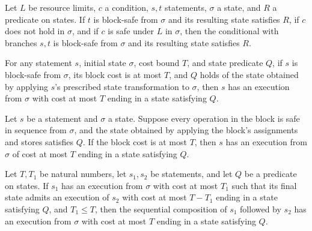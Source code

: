 \begin{theorem}
\label{Light.Stmt.Runs.ite_neg}
\leanok
{}
Let $L$ be resource limits, $c$ a condition, $s,t$ statements, $\sigma$ a state, and $R$
a predicate on states. If $t$ is block-safe from $\sigma$ and its resulting state
satisfies $R$, if $c$ does not hold in $\sigma$, and if $c$ is safe under $L$ in
$\sigma$, then the conditional with branches $s,t$ is block-safe from $\sigma$ and its
resulting state satisfies $R$.
\end{theorem}

\begin{theorem}
\label{Light.Ends.of_blockSafe}
\leanok
{}
For any statement $s$, initial state $\sigma$, cost bound $T$, and state predicate $Q$,
if $s$ is block-safe from $\sigma$, its block cost is at most $T$, and $Q$ holds of the
state obtained by applying $s$'s prescribed state transformation to $\sigma$, then $s$
has an execution from $\sigma$ with cost at most $T$ ending in a state satisfying $Q$.
\end{theorem}

\begin{theorem}
\label{Light.Ends.block}
\leanok
{}
Let $s$ be a statement and $\sigma$ a state. Suppose every operation in the block is
safe in sequence from $\sigma$, and the state obtained by applying the block's
assignments and stores satisfies $Q$. If the block cost is at most $T$, then $s$ has an
execution from $\sigma$ of cost at most $T$ ending in a state satisfying $Q$.
\end{theorem}

\begin{theorem}
\label{Light.Ends.next}
\leanok
{}
Let $T,T_1$ be natural numbers, let $s_1,s_2$ be statements, and let $Q$ be a predicate
on states. If $s_1$ has an execution from $\sigma$ with cost at most $T_1$ such that its
final state admits an execution of $s_2$ with cost at most $T-T_1$ ending in a state
satisfying $Q$, and $T_1 \le T$, then the sequential composition of $s_1$ followed by
$s_2$ has an execution from $\sigma$ with cost at most $T$ ending in a state satisfying
$Q$.
\end{theorem}

